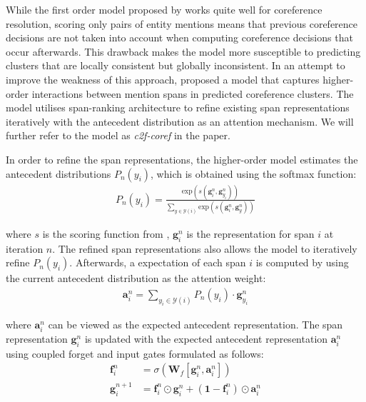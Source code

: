 \documentclass[11pt]{article}
\begin{document}
While the first order model proposed by \textcite{lee2017end} works quite well for coreference resolution, scoring only pairs of entity mentions means that previous coreference decisions are not taken into account when computing coreference decisions that occur afterwards. This drawback makes the model more susceptible to predicting clusters that are locally consistent but globally inconsistent. In an attempt to improve the weakness of this approach, \textcite{lee2018higher} proposed a model that captures higher-order interactions between mention spans in predicted coreference clusters. The model utilises span-ranking architecture to refine existing span representations iteratively with the antecedent distribution as an attention mechanism. We will further refer to the model as \textit{c2f-coref} in the paper.

In order to refine the span representations, the higher-order model estimates the antecedent distributions $P_{n}(y_{i})$, which is obtained using the softmax function:
\begin{align}
P_{n}(y_{i}) = \frac{\text{exp}(s(\pmb{g}_{i}^{n}, \pmb{g}_{y_{i}}^{n}))}{\sum_{y \in \mathcal{Y}(i)} \text{exp}(s(\pmb{g}_{i}^{n}, \pmb{g}_{y}^{n}))}
\end{align}

where $s$ is the scoring function from \textcite{lee2017end}, $\pmb{g}_{i}^{n}$ is the representation for span $i$ at iteration $n$. The refined span representations also allows the model to iteratively refine $P_{n}(y_{i})$. Afterwards, a expectation of each span $i$ is computed by using the current antecedent distribution as the attention weight:
\begin{align}
\pmb{a}_{i}^{n} = \sum\limits_{y_{i} \in \mathcal{Y}(i)} P_{n}(y_{i}) \cdot \pmb{g}_{y_{i}}^{n}
\end{align}

where $\pmb{a}_{i}^{n}$ can be viewed as the expected antecedent representation. The span representation $\pmb{g}_{i}^{n}$ is updated with the expected antecedent representation $\pmb{a}_{i}^{n}$ using coupled forget and input gates formulated as follows:
\begin{align}
\pmb{f}_{i}^{n} &= \sigma(\textbf{W}_{f}[\pmb{g}_{i}^{n}, \pmb{a}_{i}^{n}]) \\
\pmb{g}_{i}^{n+1} &= \pmb{f}_{i}^{n} \odot \pmb{g}_{i}^{n} + (\mathbf{1} - \pmb{f}_{i}^{n}) \odot \pmb{a}_{i}^{n}
\end{align}
\end{document}
